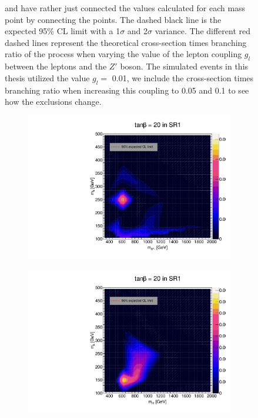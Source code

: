 \documentclass[12pt, a4paper]{book}
\begin{document}
\begin{figure}[!ht]
{   and have rather just connected the values calculated for each mass point by connecting the points. The dashed black line is the expected 95\% CL limit with a 1$\sigma$ and 2$\sigma$ variance. 
   The different red dashed lines represent the theoretical cross-section times branching ratio of the process when varying the value of the lepton coupling $g_l$ between the leptons and the $Z'$ boson. The simulated events in this thesis utilized the value $g_l=$ 0.01, we include the cross-section times branching ratio when increasing this coupling to 0.05 and 0.1 to see how the exclusions change.  }
\end{figure}

\begin{figure}[!ht]
	\centering
	\begin{subfigure}[b]{0.49\textwidth}
      \centering
      \includegraphics[width=1\textwidth]{Limits/Model_independent/50-100/2HDM/2HDM_ee_tb20.pdf}
   \end{subfigure}
   \hfill
   \begin{subfigure}[b]{0.49\textwidth}
      \centering
      \includegraphics[width=1\textwidth]{Limits/Model_independent/50-100/2HDM/2HDM_uu_tb20.pdf}

\end{subfigure}
\end{figure}
\end{document}

